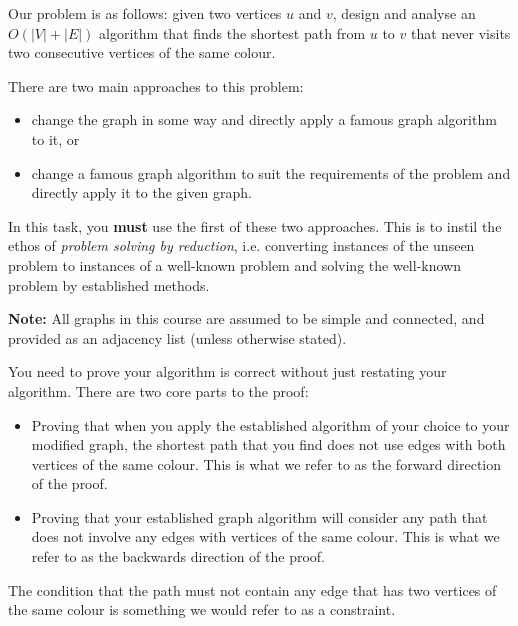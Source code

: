 \documentclass[12pt]{article}
\begin{document}
\begin{question}
\begin{center}
\end{center}

Our problem is as follows: given two vertices $u$ and $v$, design and analyse an $O(\lvert V \rvert + \lvert E \rvert)$ algorithm that finds the shortest path from $u$ to $v$ that never visits two consecutive vertices of the same colour.

There are two main approaches to this problem:
\begin{itemize}
    \item change the graph in some way and directly apply a famous graph algorithm to it, or
    \item change a famous graph algorithm to suit the requirements of the problem and directly apply it to the given graph.
\end{itemize}

In this task, you \textbf{must} use the first of these two approaches. This is to instil the ethos of \textit{problem solving by reduction}, i.e. converting instances of the unseen problem to instances of a well-known problem and solving the well-known problem by established methods.

{\bfseries Note:} All graphs in this course are assumed to be simple and connected, and provided as an adjacency list (unless otherwise stated).
\end{question}

\begin{rubric}

\correctness You need to prove your algorithm is correct without just restating your algorithm. There are two core parts to the proof:
\begin{itemize}
    \item Proving that when you apply the established algorithm of your choice to your modified graph, the shortest path that you find does not use edges with both vertices of the same colour. This is what we refer to as the forward direction of the proof.
    \item Proving that your established graph algorithm will consider any path that does not involve any edges with vertices of the same colour. This is what we refer to as the backwards direction of the proof.
\end{itemize}

\note The condition that the path must not contain any edge that has two vertices of the same colour is something we would refer to as a constraint.

\end{rubric}

\clearpage
\begin{solution}
\end{solution}
\begin{attribution}
\end{attribution}
\end{document}
